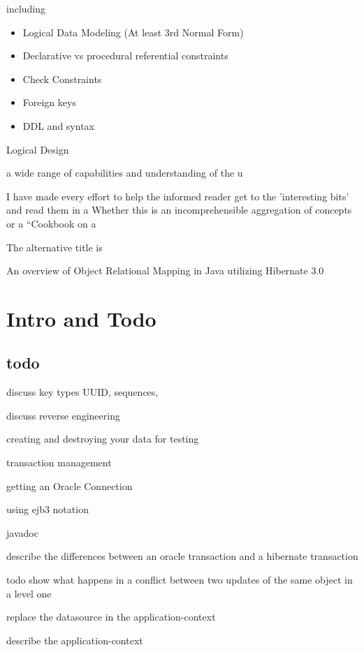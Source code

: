 \documentclass[letterpaper,10pt]{book}
\begin{document}
including 
\begin{itemize}
 \item Logical Data Modeling (At least 3rd Normal Form) 
 \item Declarative vs procedural referential constraints
 \item Check Constraints 
 \item Foreign keys 
 \item DDL and syntax
\end{itemize}


Logical Design


 a wide range of capabilities and understanding of the 
u

I have made every effort to help the informed reader get to the 'interesting bits' and read them in a   Whether this is an incomprehensible aggregation of concepts or 
a ``Cookbook on a

The alternative title is 

An overview of Object Relational Mapping in Java utilizing Hibernate 3.0  
\chapter{Intro and Todo}
\section{todo}
discuss key types UUID, sequences, 

discuss reverse engineering 

creating and destroying your data for testing

transaction management 

getting an Oracle Connection

using ejb3 notation

javadoc

describe the differences between an oracle transaction and a hibernate transaction 

todo show what happens in a conflict between two updates of the same object in a level one

replace the datasource in the application-context

describe the application-context











\end{document}

